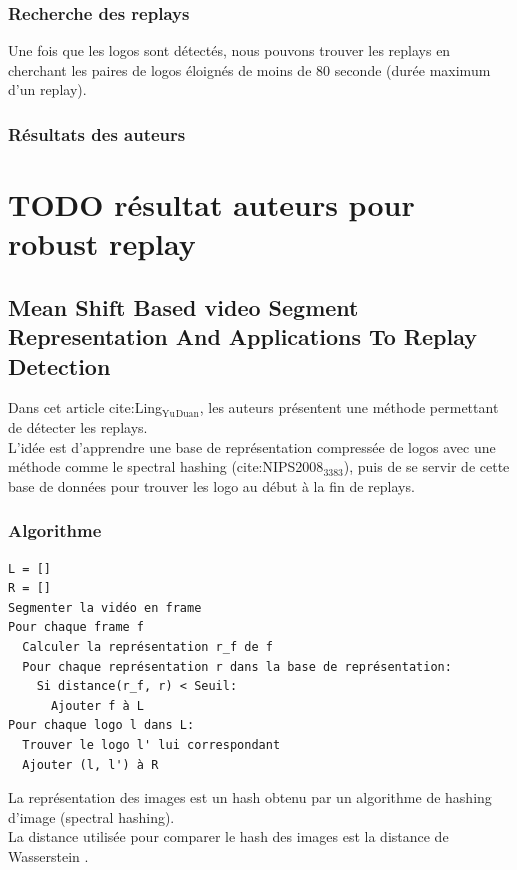 \documentclass[11pt]{article}
\begin{document}
\subsubsection{Recherche des replays}
\label{sec:org40e1e37}
Une fois que les logos sont détectés, nous pouvons trouver les replays en cherchant les paires de logos éloignés de moins de 80 seconde (durée maximum d'un replay).\\

\subsubsection{Résultats des auteurs}
\label{sec:orgc2cfb95}
\section{{\bfseries\sffamily TODO} résultat auteurs pour robust replay}
\label{sec:org76b9004}




\subsection{Mean Shift Based video Segment Representation And Applications To Replay Detection}
\label{sec:org7f75fd6}
Dans cet article cite:Ling\(_{\text{Yu}}\)\(_{\text{Duan}}\), les auteurs présentent une méthode permettant de détecter les replays.\\
L'idée est d'apprendre une base de représentation compressée de logos avec une méthode comme le spectral hashing (cite:NIPS2008\(_{\text{3383}}\)), puis de se servir de cette base de données pour trouver les logo au début à la fin de replays.\\
\subsubsection{Algorithme}
\label{sec:org6a1f06f}
\begin{verbatim}
L = []
R = []
Segmenter la vidéo en frame
Pour chaque frame f
  Calculer la représentation r_f de f
  Pour chaque représentation r dans la base de représentation:
    Si distance(r_f, r) < Seuil:
      Ajouter f à L
Pour chaque logo l dans L:
  Trouver le logo l' lui correspondant
  Ajouter (l, l') à R
\end{verbatim}
La représentation des images est un hash obtenu par un algorithme de hashing d'image (spectral hashing).\\
La distance utilisée pour comparer le hash des images est la distance de Wasserstein .\\
\end{document}
